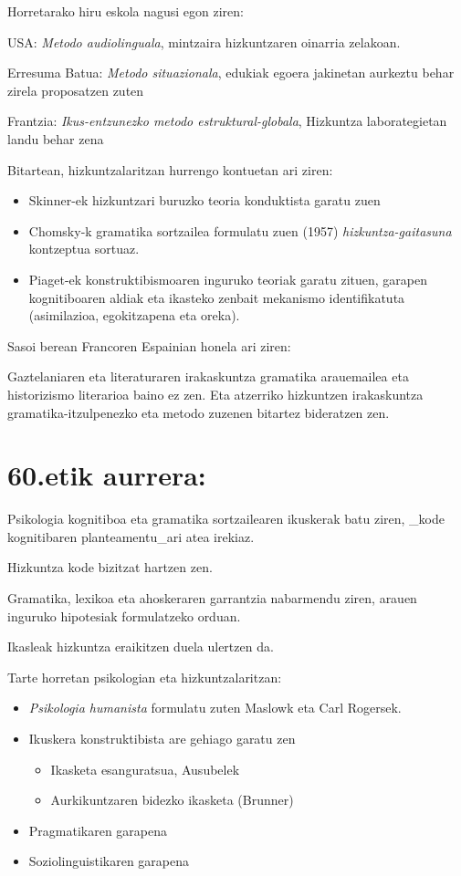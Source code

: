\documentclass[
]{book}
\providecommand{\tightlist}{%
  \setlength{\itemsep}{0pt}\setlength{\parskip}{0pt}}
\begin{document}
Horretarako hiru eskola nagusi egon ziren:

USA: \emph{Metodo audiolinguala}, mintzaira hizkuntzaren oinarria zelakoan.

Erresuma Batua: \emph{Metodo situazionala}, edukiak egoera jakinetan aurkeztu behar zirela proposatzen zuten

Frantzia: \emph{Ikus-entzunezko metodo estruktural-globala}, Hizkuntza laborategietan landu behar zena

Bitartean, hizkuntzalaritzan hurrengo kontuetan ari ziren:

\begin{itemize}
\tightlist
\item
  Skinner-ek hizkuntzari buruzko teoria konduktista garatu zuen
\item
  Chomsky-k gramatika sortzailea formulatu zuen (1957) \emph{hizkuntza-gaitasuna} kontzeptua sortuaz.
\item
  Piaget-ek konstruktibismoaren inguruko teoriak garatu zituen, garapen kognitiboaren aldiak eta ikasteko zenbait mekanismo identifikatuta (asimilazioa, egokitzapena eta oreka).
\end{itemize}

Sasoi berean Francoren Espainian honela ari ziren:

Gaztelaniaren eta literaturaren irakaskuntza gramatika arauemailea eta historizismo literarioa baino ez zen.
Eta atzerriko hizkuntzen irakaskuntza gramatika-itzulpenezko eta metodo zuzenen bitartez bideratzen zen.

\hypertarget{etik-aurrera}{%
\section{60.etik aurrera:}\label{etik-aurrera}}

Psikologia kognitiboa eta gramatika sortzailearen ikuskerak batu ziren, \_kode kognitibaren planteamentu\_ari atea irekiaz.

Hizkuntza kode bizitzat hartzen zen.

Gramatika, lexikoa eta ahoskeraren garrantzia nabarmendu ziren, arauen inguruko hipotesiak formulatzeko orduan.

Ikasleak hizkuntza eraikitzen duela ulertzen da.

Tarte horretan psikologian eta hizkuntzalaritzan:

\begin{itemize}
\tightlist
\item
  \emph{Psikologia humanista} formulatu zuten Maslowk eta Carl Rogersek.
\item
  Ikuskera konstruktibista are gehiago garatu zen

  \begin{itemize}
  \tightlist
  \item
    Ikasketa esanguratsua, Ausubelek
  \item
    Aurkikuntzaren bidezko ikasketa (Brunner)
  \end{itemize}
\item
  Pragmatikaren garapena
\item
  Soziolinguistikaren garapena
\end{itemize}
\end{document}
